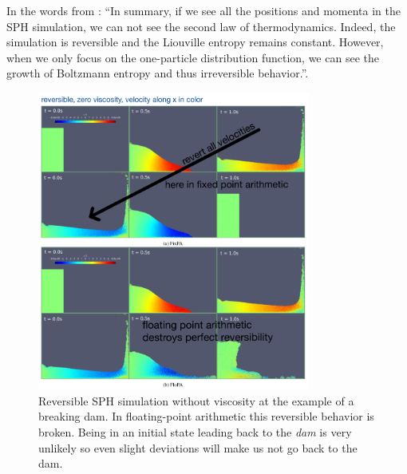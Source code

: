 
In the words from \cite{Kincl23}: \enquote{In summary, if we see all the positions and momenta in the SPH simulation, we can not see the second law of thermodynamics. Indeed, the simulation is reversible and the Liouville entropy remains constant. However, when we only focus on the one-particle distribution function, we can see the growth of Boltzmann entropy and thus irreversible behavior.}.



\begin{figure}[htb!]
    \centering
    \includegraphics[width=0.8\textwidth]{figures/reversible_dam3.png}
    \caption{Reversible SPH simulation without viscosity at the example of a breaking dam. In floating-point arithmetic this reversible behavior is broken. Being in an initial state leading back to the \textit{dam} is very unlikely so even slight deviations will make us not go back to the dam.}
    \label{fig:reversible_dam}
\end{figure}

